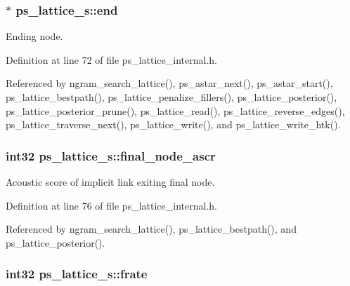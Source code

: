 \subsubsection[{end}]{$\ast$ ps\+\_\+lattice\+\_\+s\+::end}\label{structps__lattice__s_a00f30e2689853d6bcb31c8005a69dc7b}


Ending node. 



Definition at line 72 of file ps\+\_\+lattice\+\_\+internal.\+h.



Referenced by ngram\+\_\+search\+\_\+lattice(), ps\+\_\+astar\+\_\+next(), ps\+\_\+astar\+\_\+start(), ps\+\_\+lattice\+\_\+bestpath(), ps\+\_\+lattice\+\_\+penalize\+\_\+fillers(), ps\+\_\+lattice\+\_\+posterior(), ps\+\_\+lattice\+\_\+posterior\+\_\+prune(), ps\+\_\+lattice\+\_\+read(), ps\+\_\+lattice\+\_\+reverse\+\_\+edges(), ps\+\_\+lattice\+\_\+traverse\+\_\+next(), ps\+\_\+lattice\+\_\+write(), and ps\+\_\+lattice\+\_\+write\+\_\+htk().

\subsubsection[{final\+\_\+node\+\_\+ascr}]{\setlength{\rightskip}{0pt plus 5cm}int32 ps\+\_\+lattice\+\_\+s\+::final\+\_\+node\+\_\+ascr}\label{structps__lattice__s_aba113d4134c72d7405423c77bcc1247e}


Acoustic score of implicit link exiting final node. 



Definition at line 76 of file ps\+\_\+lattice\+\_\+internal.\+h.



Referenced by ngram\+\_\+search\+\_\+lattice(), ps\+\_\+lattice\+\_\+bestpath(), and ps\+\_\+lattice\+\_\+posterior().

\subsubsection[{frate}]{\setlength{\rightskip}{0pt plus 5cm}int32 ps\+\_\+lattice\+\_\+s\+::frate}\label{structps__lattice__s_a5159a2ff1e03a7c9782854bc67e56530}


